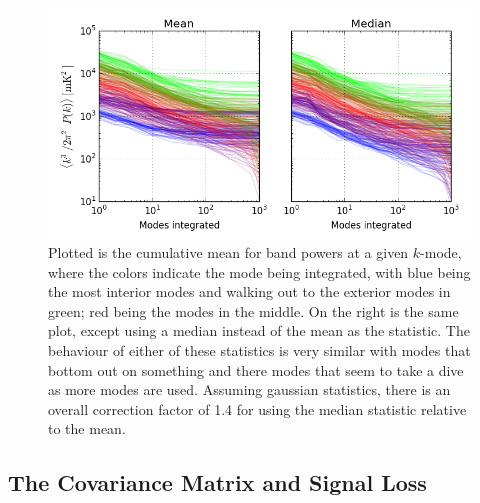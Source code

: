 \documentclass[twocolumn,numberedappendix]{emulateapj} \shorttitle{PSA64}
\begin{document}
\begin{figure}[t!]\centering
\includegraphics[width=1.8\columnwidth]{plots/pspec_variance.png}
\caption{Plotted is the cumulative mean for band powers at a given $k$-mode,
where the colors indicate the mode being integrated, with blue being the most
interior modes and walking out to the exterior modes in green; red being the
modes in the middle. On the right is the same plot, except using a median
instead of the mean as the statistic. The behaviour of either of these
statistics is very similar with modes that bottom out on something and there
modes that seem to take a dive as more modes are used. Assuming gaussian
statistics, there is an overall correction factor of 1.4 for using the median
statistic relative to the mean.}
\label{fig:pspec_variance}
\end{figure}


\subsection{The Covariance Matrix and Signal Loss}
%
\end{document}
